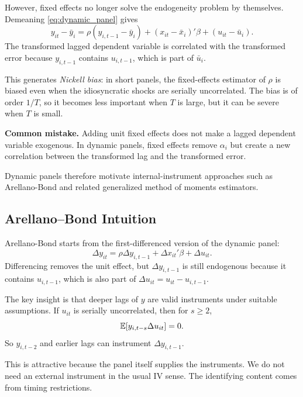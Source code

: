 However, fixed effects no longer solve the endogeneity problem by themselves. Demeaning \eqref{eq:dynamic_panel} gives
\[
y_{it}-\bar{y}_i
=
\rho (y_{i,t-1}-\bar{y}_i)
+
(x_{it}-\bar{x}_i)'\beta + (u_{it}-\bar{u}_i).
\]
The transformed lagged dependent variable is correlated with the transformed error because $y_{i,t-1}$ contains $u_{i,t-1}$, which is part of $\bar{u}_i$.

This generates \emph{Nickell bias}: in short panels, the fixed-effects estimator of $\rho$ is biased even when the idiosyncratic shocks are serially uncorrelated. The bias is of order $1/T$, so it becomes less important when $T$ is large, but it can be severe when $T$ is small.

\begin{boxF}
\textbf{Common mistake.}
Adding unit fixed effects does not make a lagged dependent variable exogenous. In dynamic panels, fixed effects remove $\alpha_i$ but create a new correlation between the transformed lag and the transformed error.
\end{boxF}

Dynamic panels therefore motivate internal-instrument approaches such as Arellano-Bond and related generalized method of moments estimators.

\subsection{Arellano--Bond Intuition}
Arellano-Bond starts from the first-differenced version of the dynamic panel:
\begin{equation}
\Delta y_{it} = \rho \Delta y_{i,t-1} + \Delta x_{it}'\beta + \Delta u_{it}.
\label{eq:ab_diff}
\end{equation}
Differencing removes the unit effect, but $\Delta y_{i,t-1}$ is still endogenous because it contains $u_{i,t-1}$, which is also part of $\Delta u_{it}=u_{it}-u_{i,t-1}$.

The key insight is that deeper lags of $y$ are valid instruments under suitable assumptions. If $u_{it}$ is serially uncorrelated, then for $s \geq 2$,
\begin{equation}
\mathbb{E}[y_{i,t-s}\Delta u_{it}] = 0.
\label{eq:ab_moment}
\end{equation}
So $y_{i,t-2}$ and earlier lags can instrument $\Delta y_{i,t-1}$.

This is attractive because the panel itself supplies the instruments. We do not need an external instrument in the usual \ac{IV} sense. The identifying content comes from timing restrictions.

